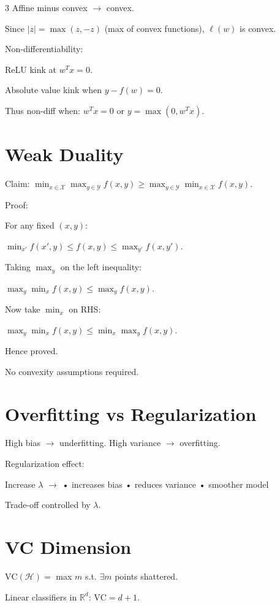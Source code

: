 \documentclass[8pt,fleqn]{extarticle}
\begin{document}
\begin{multicols}{3}
Affine minus convex $\to$ convex.

Since $|z|=\max(z,-z)$ (max of convex functions),
$\ell(w)$ is convex.

Non-differentiability:

ReLU kink at $w^Tx=0$.

Absolute value kink when $y-f(w)=0$.

Thus non-diff when:
$w^Tx=0$ or $y=\max(0,w^Tx)$.


\section*{Weak Duality}

Claim:
$\min_{x\in\mathcal X}\max_{y\in\mathcal Y} f(x,y)
\ge
\max_{y\in\mathcal Y}\min_{x\in\mathcal X} f(x,y)$.

Proof:

For any fixed $(x,y)$:

$\min_{x'} f(x',y) \le f(x,y) \le \max_{y'} f(x,y')$.

Taking $\max_y$ on the left inequality:

$\max_y \min_x f(x,y) \le \max_y f(x,y)$.

Now take $\min_x$ on RHS:

$\max_y \min_x f(x,y)
\le
\min_x \max_y f(x,y)$.

Hence proved.

No convexity assumptions required.


\section*{Overfitting vs Regularization}

High bias $\to$ underfitting.
High variance $\to$ overfitting.

Regularization effect:

Increase $\lambda$ $\to$
• increases bias
• reduces variance
• smoother model

Trade-off controlled by $\lambda$.


\section*{VC Dimension}

$\text{VC}(\mathcal H)=$ max $m$ s.t. $\exists m$ points shattered.

Linear classifiers in $\mathbb R^d$: $\text{VC}=d+1$.


\end{multicols}
\end{document}
